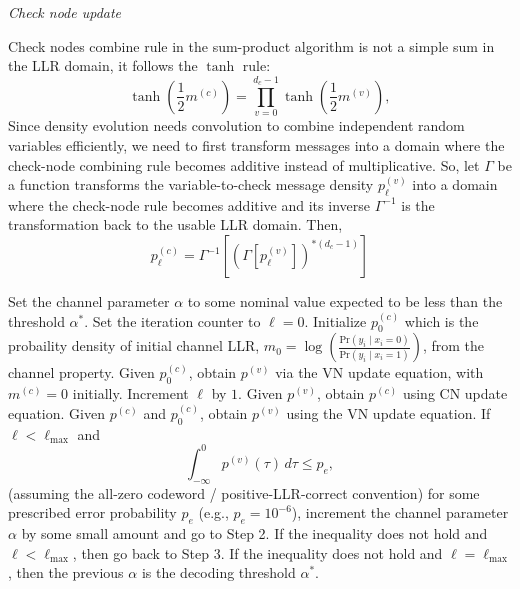 \documentclass[11pt]{article}
\begin{document}
\par\medskip
\par\medskip
\noindent \textit{Check node update}

Check nodes combine rule in the sum-product algorithm is not a simple sum in the LLR domain, it follows the $\tanh$ rule:
\[
\tanh(\frac{1}{2} m^{(c)}) = \prod_{v = 0}^{d_c - 1} \tanh\left(\frac{1}{2}m^{(v)}\right),
\]
Since density evolution needs convolution to combine independent random variables efficiently, we need to first transform messages into a domain where the check-node combining rule becomes additive instead of multiplicative. So, let $\Gamma$ be a function transforms the variable-to-check message density $p^{(v)}_{\ell}$ into a domain where the check-node rule becomes additive and its inverse $\Gamma^{-1}$ is the transformation back to the usable LLR domain. Then,
\[
p_\ell^{(c)} = \Gamma^{-1}\left[\left(\Gamma\left[p_\ell^{(v)}\right]\right)^{*(d_c - 1)}\right]
\]


\begin{algorithm}[H]
\caption{Density Evolution for Regular LDPC Codes}
\begin{algorithmic}[1]
\State Set the channel parameter $\alpha$ to some nominal value expected to be less than the threshold $\alpha^*$. Set the iteration counter to $\ell=0$.
\State Initialize $p_0^{(c)}$ which is the probaility density of initial channel LLR, $m_0 = \log\left( \frac{\text{Pr}(y_i \mid x_i = 0)}{\text{Pr}(y_i \mid x_i = 1)} \right)$, from the channel property. Given $p_0^{(c)}$, obtain $p^{(v)}$ via the VN update equation, with $m^{(c)}=0$ initially.
\State Increment $\ell$ by $1$. Given $p^{(v)}$, obtain $p^{(c)}$ using CN update equation.
\State Given $p^{(c)}$ and $p_0^{(c)}$, obtain $p^{(v)}$ using the VN update equation.
\State If $\ell < \ell_{\max}$ and
\[
\int_{-\infty}^{0} p^{(v)}(\tau)\,d\tau \leq p_e,
\]
(assuming the all-zero codeword / positive-LLR-correct convention)
for some prescribed error probability $p_e$ (e.g., $p_e=10^{-6}$), increment the channel parameter $\alpha$ by some small amount and go to Step 2. If the inequality does not hold and $\ell<\ell_{\max}$, then go back to Step 3. If the inequality does not hold and $\ell=\ell_{\max}$, then the previous $\alpha$ is the decoding threshold $\alpha^*$.
\end{algorithmic}
\end{algorithm}
\end{document}
